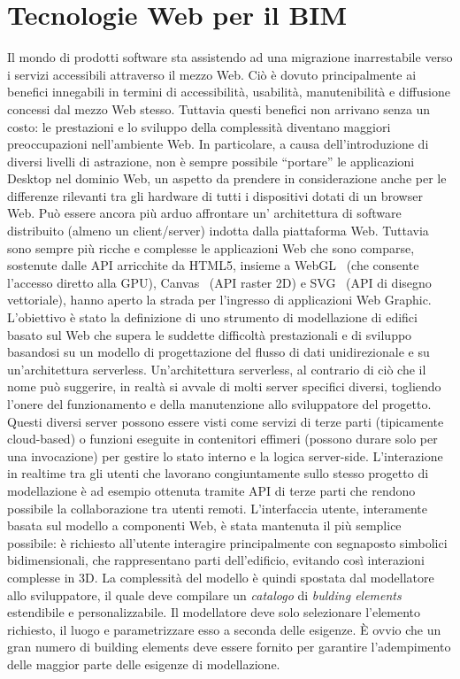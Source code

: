 
\section{Tecnologie Web per il BIM}
\label{sec:chapter_1_section_3}

Il mondo di prodotti software sta assistendo ad una migrazione inarrestabile verso i servizi accessibili
attraverso il mezzo Web. Ciò è dovuto principalmente ai benefici innegabili in termini di accessibilità, usabilità,
manutenibilità e diffusione concessi dal mezzo Web stesso.
Tuttavia questi benefici non arrivano senza un costo: le prestazioni e lo sviluppo della complessità diventano
maggiori preoccupazioni nell'ambiente Web.
In particolare, a causa dell'introduzione di diversi livelli di astrazione, non è sempre possibile ``portare'' le
applicazioni Desktop nel dominio Web, un aspetto da prendere in considerazione anche per le differenze rilevanti
tra gli hardware di tutti i dispositivi dotati di un browser Web.
Può essere ancora più arduo affrontare un' architettura di software distribuito (almeno un client/server)
indotta dalla piattaforma Web. Tuttavia sono sempre più ricche e complesse le applicazioni Web che sono comparse,
sostenute dalle API arricchite da HTML5, insieme a WebGL~\cite{webgl}
(che consente l'accesso diretto alla GPU), Canvas~\cite{Munro:15:HCC} (API raster 2D) e SVG~\cite{Jackson:11:SVG}
(API di disegno vettoriale), hanno aperto la strada per l'ingresso di applicazioni Web Graphic.
L'obiettivo è stato la definizione di uno strumento di modellazione di edifici basato sul Web
che supera le suddette difficoltà prestazionali e di sviluppo basandosi su un modello di progettazione del flusso di dati
unidirezionale e su un'architettura serverless.
Un'architettura serverless, al contrario di ciò che il nome può suggerire, in realtà si avvale di molti server specifici
diversi, togliendo l'onere del funzionamento e della manutenzione allo sviluppatore del progetto.
Questi diversi server possono essere visti come servizi di terze parti (tipicamente cloud-based) o funzioni eseguite
in contenitori effimeri (possono durare solo per una invocazione) per gestire lo stato interno e la logica server-side.
L'interazione in realtime tra gli utenti che lavorano congiuntamente sullo stesso progetto di modellazione
è ad esempio ottenuta tramite API di terze parti che rendono possibile la collaborazione tra utenti remoti.
L'interfaccia utente, interamente basata sul modello a componenti Web, è stata mantenuta il più semplice possibile:
è richiesto all'utente interagire principalmente con segnaposto simbolici bidimensionali, che rappresentano parti dell'edificio,
evitando così interazioni complesse in 3D.
La complessità del modello è quindi spostata dal modellatore allo sviluppatore, il quale deve compilare un \emph{catalogo} di
\emph{bulding elements} estendibile e personalizzabile. Il modellatore deve solo selezionare l'elemento richiesto,
il luogo e parametrizzare esso a seconda delle esigenze. È ovvio che un gran numero di building elements deve essere fornito
per garantire l'adempimento delle maggior parte delle esigenze di modellazione.
